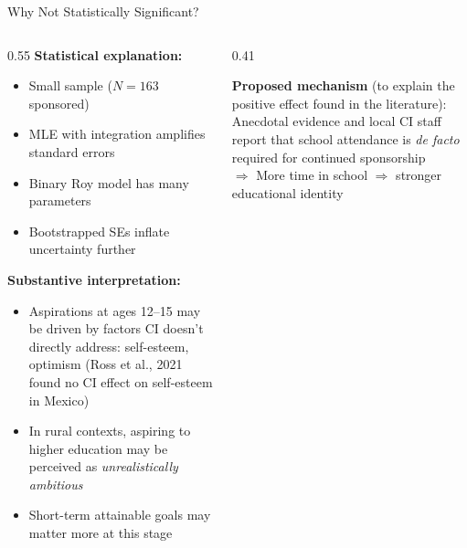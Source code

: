 \documentclass[aspectratio=169, 10pt]{beamer}
\begin{document}
\begin{frame}{Why Not Statistically Significant?}
  \begin{columns}
    \begin{column}{0.55\textwidth}
      \textbf{Statistical explanation:}
      \begin{itemize}
        \item Small sample ($N=163$ sponsored)
        \item MLE with integration amplifies standard errors
        \item Binary Roy model has many parameters
        \item Bootstrapped SEs inflate uncertainty further
      \end{itemize}
      \vspace{0.5em}
      \textbf{Substantive interpretation:}
      \begin{itemize}
        \item Aspirations at ages 12--15 may be driven by factors CI doesn't directly address: self-esteem, optimism (Ross et al., 2021 found no CI effect on self-esteem in Mexico)
        \item In rural contexts, aspiring to higher education may be perceived as \textit{unrealistically ambitious}
        \item Short-term attainable goals may matter more at this stage \citep{Genicot2017}
      \end{itemize}
    \end{column}
    \begin{column}{0.41\textwidth}
      \begin{keybox}
        \textbf{Proposed mechanism} (to explain the positive effect found in the literature): Anecdotal evidence and local CI staff report that school attendance is \textit{de facto} required for continued sponsorship\\[0.5em]
        $\Rightarrow$ More time in school $\Rightarrow$ stronger educational identity
      \end{keybox}
    \end{column}
  \end{columns}
\end{frame}
\end{document}
